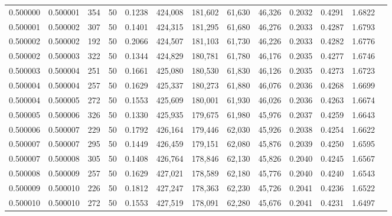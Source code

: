 \begin{tabular}{rrrrrrrrrrrrr}
0.500000 & 0.500001 & 354 &  50 &                                     0.1238 & 424,008 & 181,602 &  61,630 &  46,326 & 0.2032 & 0.4291 & 1.6822 \\
0.500001 & 0.500002 & 307 &  50 &                                     0.1401 & 424,315 & 181,295 &  61,680 &  46,276 & 0.2033 & 0.4287 & 1.6793 \\
0.500002 & 0.500002 & 192 &  50 &                                     0.2066 & 424,507 & 181,103 &  61,730 &  46,226 & 0.2033 & 0.4282 & 1.6776 \\
0.500002 & 0.500003 & 322 &  50 &                                     0.1344 & 424,829 & 180,781 &  61,780 &  46,176 & 0.2035 & 0.4277 & 1.6746 \\
0.500003 & 0.500004 & 251 &  50 &                                     0.1661 & 425,080 & 180,530 &  61,830 &  46,126 & 0.2035 & 0.4273 & 1.6723 \\
0.500004 & 0.500004 & 257 &  50 &                                     0.1629 & 425,337 & 180,273 &  61,880 &  46,076 & 0.2036 & 0.4268 & 1.6699 \\
0.500004 & 0.500005 & 272 &  50 &                                     0.1553 & 425,609 & 180,001 &  61,930 &  46,026 & 0.2036 & 0.4263 & 1.6674 \\
0.500005 & 0.500006 & 326 &  50 &                                     0.1330 & 425,935 & 179,675 &  61,980 &  45,976 & 0.2037 & 0.4259 & 1.6643 \\
0.500006 & 0.500007 & 229 &  50 &                                     0.1792 & 426,164 & 179,446 &  62,030 &  45,926 & 0.2038 & 0.4254 & 1.6622 \\
0.500007 & 0.500007 & 295 &  50 &                                     0.1449 & 426,459 & 179,151 &  62,080 &  45,876 & 0.2039 & 0.4250 & 1.6595 \\
0.500007 & 0.500008 & 305 &  50 &                                     0.1408 & 426,764 & 178,846 &  62,130 &  45,826 & 0.2040 & 0.4245 & 1.6567 \\
0.500008 & 0.500009 & 257 &  50 &                                     0.1629 & 427,021 & 178,589 &  62,180 &  45,776 & 0.2040 & 0.4240 & 1.6543 \\
0.500009 & 0.500010 & 226 &  50 &                                     0.1812 & 427,247 & 178,363 &  62,230 &  45,726 & 0.2041 & 0.4236 & 1.6522 \\
0.500010 & 0.500010 & 272 &  50 &                                     0.1553 & 427,519 & 178,091 &  62,280 &  45,676 & 0.2041 & 0.4231 & 1.6497 \\

\end{tabular}
